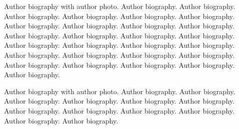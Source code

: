 \documentclass[a4paper,fleqn]{cas-sc}
\begin{document}
Author biography with author photo.
Author biography. Author biography. Author biography.
Author biography. Author biography. Author biography.
Author biography. Author biography. Author biography.
Author biography. Author biography. Author biography.
Author biography. Author biography. Author biography.
Author biography. Author biography. Author biography.
Author biography. Author biography. Author biography.
Author biography. Author biography. Author biography.
Author biography. Author biography. Author biography.
\endbio

\vskip3pc

Author biography with author photo.
Author biography. Author biography. Author biography.
Author biography. Author biography. Author biography.
Author biography. Author biography. Author biography.
Author biography. Author biography. Author biography.
\endbio
\end{document}
